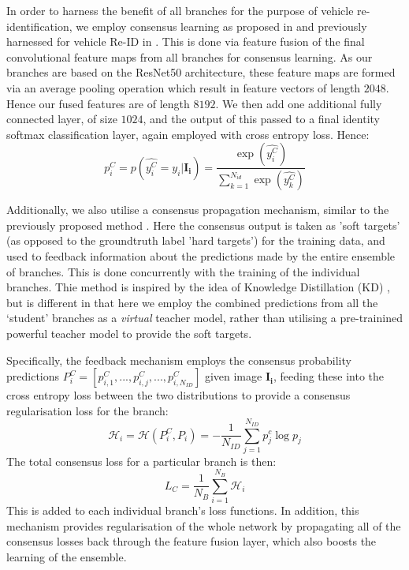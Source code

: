 \documentclass[10pt,twocolumn,letterpaper]{article}
\begin{document}
In order to harness the benefit of all branches for the purpose of vehicle re-identification, we employ consensus learning as proposed in \cite{chen2017person} and previously harnessed for vehicle Re-ID in \cite{kanaci2018vehicle}. This is done via feature fusion of the final convolutional feature maps from all branches for consensus learning. As our branches are based on the ResNet50 architecture, these feature maps are formed via an average pooling operation which result in feature vectors of length $2048$. Hence our fused features are of length $8192$. We then add one additional fully connected layer, of size $1024$, and the output of this passed to a final identity softmax classification layer, again employed with cross entropy loss. Hence:
\begin{equation}
  p_i^C = p(\hat{y_i^C} = y_i|\mathbf{I_i}) = \frac{\exp(\hat{y_i^C})}{\sum_{k=1}^{N_{id}}\exp(\hat{y_k^C})}
\end{equation}

Additionally, we also utilise a consensus propagation mechanism, similar to the previously proposed method \cite{chen2017person,kanaci2018vehicle}. Here the consensus output is taken as 'soft targets' (as opposed to the groundtruth label 'hard targets') for the training data, and used to feedback information about the predictions made by the entire ensemble of branches. This is done concurrently with the training of the individual branches. Thie method is inspired by the idea of Knowledge Distillation (KD) \cite{hinton2015distilling}, but is different in that here we employ the combined predictions from all the `student' branches as a \emph{virtual} teacher model, rather than utilising a pre-trainined powerful teacher model to provide the soft targets.

Specifically, the feedback mechanism employs the consensus probability predictions $P^C_i = \left[p_{i,1}^C,...,p_{i,j}^C,...,p_{i,N_{ID}}^C\right]$ given image $\mathbf{I_i}$, feeding these into the cross entropy loss between the two distributions to provide a consensus regularisation loss for the branch:
\begin{equation}
  \mathcal{H}_i = \mathcal{H}(P^C_i, P_i) = -\frac{1}{N_{ID}}\sum_{j=1}^{N_{ID}} p_j^c \log{p_j}
\end{equation}
The total consensus loss for a particular branch is then:
\begin{equation}
  L_{C} = \frac{1}{N_B} \sum_{i=1}^{N_B} \mathcal{H}_i
\end{equation}
This is added to each individual branch's loss functions. In addition, this mechanism provides regularisation of the whole network by propagating all of the consensus losses back through the feature fusion layer, which also boosts the learning of the ensemble.
\end{document}
